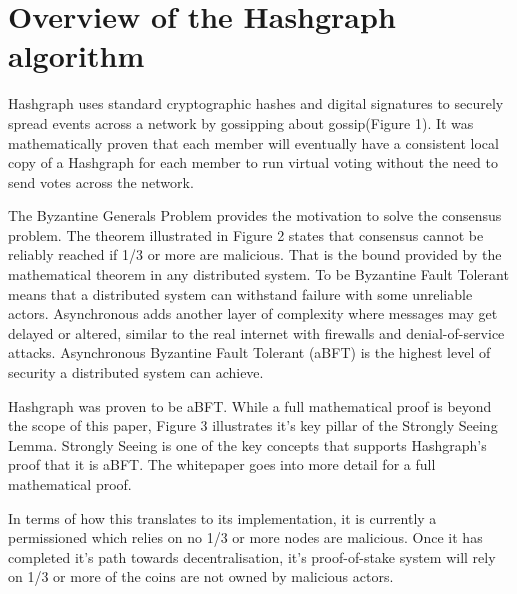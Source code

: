 \section{Overview of the Hashgraph algorithm}



Hashgraph uses standard cryptographic hashes and digital signatures to securely spread events across a network by gossipping about gossip(Figure 1). It was mathematically proven that each member will eventually have a consistent local copy of a Hashgraph for each member to run virtual voting without the need to send votes across the network\cite{baird2016}.


The Byzantine Generals Problem\cite{shostak1982byzantine} provides the motivation to solve the consensus problem. The theorem illustrated in Figure 2 states that consensus cannot be reliably reached if 1/3 or more are malicious. That is the bound provided by the mathematical theorem in any distributed system. To be Byzantine Fault Tolerant means that a distributed system can withstand failure with some unreliable actors. Asynchronous adds another layer of complexity where messages may get delayed or altered, similar to the real internet with firewalls and denial-of-service attacks. Asynchronous Byzantine Fault Tolerant (aBFT) is the highest level of security a distributed system can achieve\cite{coq2018}.


Hashgraph was proven to be aBFT\cite{baird2016}. While a full mathematical proof is beyond the scope of this paper, Figure 3 illustrates it's key pillar of the Strongly Seeing Lemma. Strongly Seeing is one of the key concepts that supports Hashgraph's proof that it is aBFT. The whitepaper goes into more detail for a full mathematical proof.

In terms of how this translates to its implementation, it is currently a permissioned which relies on no 1/3 or more nodes are malicious. Once it has completed it's path towards decentralisation, it's proof-of-stake system will rely on 1/3 or more of the coins are not owned by malicious actors. 

% 


